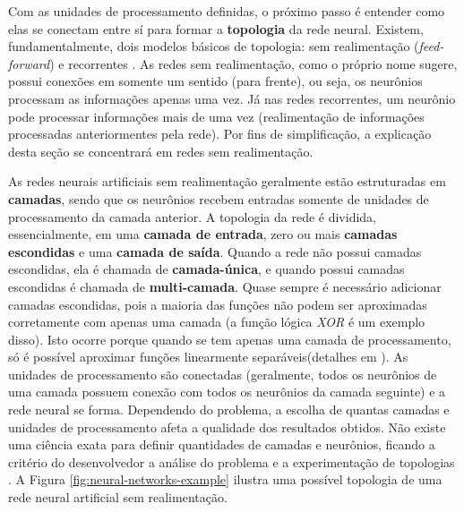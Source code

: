 Com as unidades de processamento definidas, o próximo passo é entender como elas
se conectam entre sí para formar a \textbf{topologia} da rede neural. Existem,
fundamentalmente, dois modelos básicos de topologia: sem realimentação
(\textit{feed-forward}) e recorrentes \cite[Cap. 18]{RussellNorvig200912}. As
redes sem realimentação, como o próprio nome sugere, possui conexões em somente
um sentido (para frente), ou seja, os neurônios processam as informações apenas
uma vez. Já nas redes recorrentes, um neurônio pode processar informações mais
de uma vez (realimentação de informações processadas anteriormentes pela rede).
Por fins de simplificação, a explicação desta seção se concentrará em redes sem
realimentação.

As redes neurais artificiais sem realimentação geralmente estão estruturadas em
\textbf{camadas}, sendo que os neurônios recebem entradas somente de unidades de
processamento da camada anterior. A topologia da rede é dividida,
essencialmente, em uma \textbf{camada de entrada}, zero ou mais \textbf{camadas
escondidas} e uma \textbf{camada de saída}. Quando a rede não possui camadas
escondidas, ela é chamada de \textbf{camada-única}, e quando possui camadas
escondidas é chamada de \textbf{multi-camada}. Quase sempre é necessário
adicionar camadas escondidas, pois a maioria das funções não podem ser
aproximadas corretamente com apenas uma camada (a função lógica \textit{XOR} é
um exemplo disso). Isto ocorre porque quando se tem apenas uma camada de
processamento, só é possível aproximar funções linearmente separáveis(detalhes
em \cite[Cap. 18]{RussellNorvig200912}). As unidades de processamento são
conectadas (geralmente, todos os neurônios de uma camada possuem conexão com
todos os neurônios da camada seguinte) e a rede neural se forma. Dependendo do
problema, a escolha de quantas camadas e unidades de processamento afeta a
qualidade dos resultados obtidos. Não existe uma ciência exata para definir
quantidades de camadas e neurônios, ficando a critério do desenvolvedor a
análise do problema e a experimentação de topologias \cite[Cap.
18]{RussellNorvig200912}. A Figura \ref{fig:neural-networks-example} ilustra uma
possível topologia de uma rede neural artificial sem realimentação.

